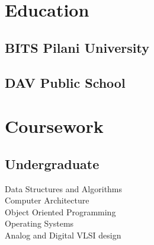\documentclass[]{deedy-resume-openfont}
\begin{document}
%
%
\lastupdated

%
%

%
%

\begin{minipage}[t]{0.33\textwidth} 


\section{Education} 
\vspace{\topsep}
\subsection{BITS Pilani University}
\sectionsep

\subsection{DAV Public School}
\vspace{\topsep}
\sectionsep


\section{Coursework}
\vspace{\topsep}
\subsection{Undergraduate}
Data Structures and Algorithms \\
Computer Architecture\\
Object Oriented Programming\\
Operating Systems \\
Analog and Digital VLSI design\\


\end{minipage}
\end{document}
